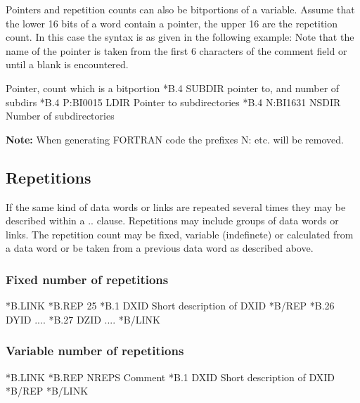Pointers and repetition counts can also be bitportions of a variable.
Assume that the lower 16 bits of a word contain a pointer, the upper
16 are the repetition count.
In this case the syntax is as given in the following example:
Note that the name of the pointer  is taken from the first 6 characters
of the comment field or until a blank is encountered.
 
\begin{XMPt}{Pointer, count which is a bitportion}
*B.4      SUBDIR     pointer to, and number of subdirs
*B.4      P:BI0015   LDIR     Pointer to subdirectories
*B.4      N:BI1631   NSDIR    Number of subdirectories
\end{XMPt}
 
{\bf Note:} When generating FORTRAN code the prefixes N: etc. will
            be removed.
 
\subsection{Repetitions}
If the same kind of data words or links are repeated several times
they may be described within a  ..  clause. 
Repetitions may include groups of data words or links. 
The repetition count may be fixed, variable
(indefinete) or calculated from a data word or be taken from a previous
data word as described above.
 
\subsubsection*{Fixed number of repetitions}
 
\begin{XMP}
*B.LINK
*B.REP    25
*B.1      DXID     Short description of DXID
*B/REP
*B.26     DYID     ....
*B.27     DZID     ....
*B/LINK
\end{XMP}
 
\subsubsection*{Variable number of repetitions}
 
\begin{XMP}
*B.LINK
*B.REP    NREPS    Comment
*B.1      DXID     Short description of DXID
*B/REP
*B/LINK
\end{XMP}
 
